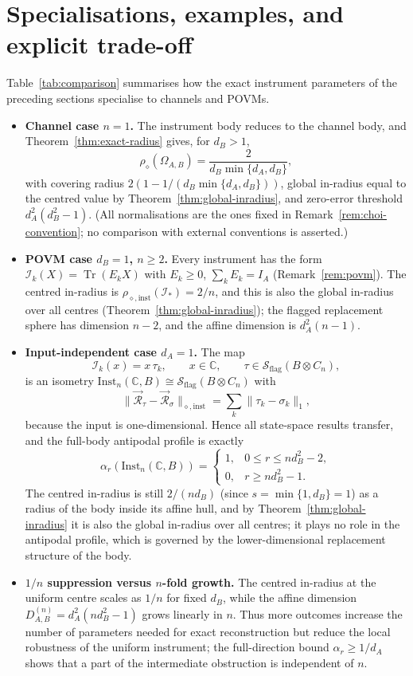 \documentclass[11pt,a4paper]{article}
\newcommand{\Sstate}{\mathcal{S}}
\newcommand{\Inst}{\mathrm{Inst}}
\newcommand{\Tr}{\operatorname{Tr}}
\begin{document}
\section{Specialisations, examples, and explicit trade-off}
\label{sec:specialisations}

Table~\ref{tab:comparison} summarises how the exact instrument parameters of the preceding sections specialise to channels and POVMs.

\begin{itemize}[leftmargin=*,itemsep=3pt]
\item \textbf{Channel case $n=1$.} The instrument body reduces to the channel body, and Theorem~\ref{thm:exact-radius} gives, for $d_B>1$,
\[
\rho_\diamond(\Omega_{A,B})=\frac{2}{d_B\min\{d_A,d_B\}},
\]
with covering radius $2(1-1/(d_B\min\{d_A,d_B\}))$, global in-radius equal to the centred value by Theorem~\ref{thm:global-inradius}, and zero-error threshold $d_A^2(d_B^2-1)$. (All normalisations are the ones fixed in Remark~\ref{rem:choi-convention}; no comparison with external conventions is asserted.)

\item \textbf{POVM case $d_B=1$, $n\ge2$.} Every instrument has the form $\mathcal I_k(X)=\Tr(E_kX)$ with $E_k\ge0$, $\sum_kE_k=I_A$ (Remark~\ref{rem:povm}). The centred in-radius is $\rho_{\diamond,\mathrm{inst}}(\mathcal I_*)=2/n$, and this is also the global in-radius over all centres (Theorem~\ref{thm:global-inradius}); the flagged replacement sphere has dimension $n-2$, and the affine dimension is $d_A^2(n-1)$.

\item \textbf{Input-independent case $d_A=1$.} The map
\[
\mathcal I_k(x)=x\,\tau_k,\qquad x\in\mathbb C,\qquad \tau\in\Sstate_{\mathrm{flag}}(B\otimes C_n),
\]
is an isometry $\Inst_n(\mathbb C,B)\cong\Sstate_{\mathrm{flag}}(B\otimes C_n)$ with
\[
\|\vec{\mathcal R}_\tau-\vec{\mathcal R}_\sigma\|_{\diamond,\mathrm{inst}}
=\sum_k\|\tau_k-\sigma_k\|_1,
\]
because the input is one-dimensional. Hence all state-space results transfer, and the full-body antipodal profile is exactly
\[
\alpha_r(\Inst_n(\mathbb C,B))=
\begin{cases}
1,&0\le r\le nd_B^2-2,\\
0,&r\ge nd_B^2-1.
\end{cases}
\]
The centred in-radius is still $2/(nd_B)$ (since $s=\min\{1,d_B\}=1$) as a radius of the body inside its affine hull, and by Theorem~\ref{thm:global-inradius} it is also the global in-radius over all centres; it plays no role in the antipodal profile, which is governed by the lower-dimensional replacement structure of the body.

\item \textbf{$1/n$ suppression versus $n$-fold growth.} The centred in-radius at the uniform centre scales as $1/n$ for fixed $d_B$, while the affine dimension $D_{A,B}^{(n)}=d_A^2(nd_B^2-1)$ grows linearly in $n$. Thus more outcomes increase the number of parameters needed for exact reconstruction but reduce the local robustness of the uniform instrument; the full-direction bound $\alpha_r\ge1/d_A$ shows that a part of the intermediate obstruction is independent of $n$.
\end{itemize}
\end{document}
